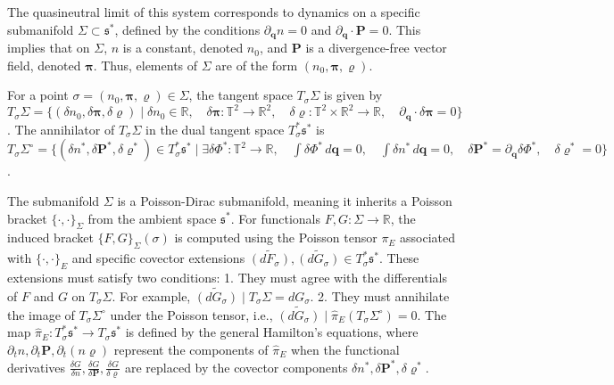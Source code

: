 \documentclass[10pt]{article}
\begin{document}
The quasineutral limit of this system corresponds to dynamics on a specific submanifold $\Sigma\subset\mathfrak{s}^*$, defined by the conditions $\partial_{\bm{q}}n = 0$ and $\partial_{\bm{q}}\cdot\bm{P} = 0$. This implies that on $\Sigma$, $n$ is a constant, denoted $n_0$, and $\bm{P}$ is a divergence-free vector field, denoted $\bm{\pi}$. Thus, elements of $\Sigma$ are of the form $(n_0,\bm{\pi},\varrho)$.

For a point $\sigma=(n_0,\bm{\pi},\varrho)\in\Sigma$, the tangent space $T_\sigma\Sigma$ is given by $T_\sigma\Sigma = \{(\delta n_0,\delta\bm{\pi},\delta\varrho)\mid \delta n_0\in \mathbb{R},\quad \delta\bm{\pi}:\mathbb{T}^2\rightarrow\mathbb{R}^2,\quad \delta\varrho:\mathbb{T}^2\times \mathbb{R}^2\rightarrow\mathbb{R}, \quad \partial_{\bm{q}}\cdot\delta\bm{\pi} = 0\}$.
The annihilator of $T_\sigma\Sigma$ in the dual tangent space $T^*_\sigma\mathfrak{s}^*$ is $T_\sigma\Sigma^\circ = \{(\delta n^*,\delta\bm{P}^*,\delta\varrho^*)\in T^*_\sigma\mathfrak{s}^*\mid \exists\delta\Phi^*:\mathbb{T}^2\rightarrow\mathbb{R},\quad\int\delta\Phi^*\,d\bm{q} = 0,\quad \int \delta n^*\,d\bm{q} = 0,\quad \delta\bm{P}^* =\partial_{\bm{q}}\delta\Phi^*,\quad \delta\varrho^* = 0\}$.

The submanifold $\Sigma$ is a Poisson-Dirac submanifold, meaning it inherits a Poisson bracket $\{\cdot,\cdot\}_\Sigma$ from the ambient space $\mathfrak{s}^*$. For functionals $F,G:\Sigma\rightarrow\mathbb{R}$, the induced bracket $\{F,G\}_\Sigma(\sigma)$ is computed using the Poisson tensor $\pi_E$ associated with $\{\cdot,\cdot\}_E$ and specific covector extensions $\widetilde{(dF_\sigma)}, \widetilde{(dG_\sigma)}\in T^*_\sigma\mathfrak{s}^*$. These extensions must satisfy two conditions:
1.  They must agree with the differentials of $F$ and $G$ on $T_\sigma\Sigma$. For example, $\widetilde{(dG_\sigma)}\mid T_\sigma\Sigma = dG_\sigma$.
2.  They must annihilate the image of $T_\sigma\Sigma^\circ$ under the Poisson tensor, i.e., $\widetilde{(dG_\sigma)}\mid \widehat{\pi}_E(T_\sigma\Sigma^\circ) = 0$. The map $\widehat{\pi}_E: T^*_\sigma\mathfrak{s}^* \rightarrow T_\sigma\mathfrak{s}^*$ is defined by the general Hamilton's equations, where $\partial_t n, \partial_t \bm{P}, \partial_t (n\varrho)$ represent the components of $\widehat{\pi}_E$ when the functional derivatives $\frac{\delta G}{\delta n}, \frac{\delta G}{\delta \bm{P}}, \frac{\delta G}{\delta \varrho}$ are replaced by the covector components $\delta n^*, \delta \bm{P}^*, \delta \varrho^*$.
\end{document}
